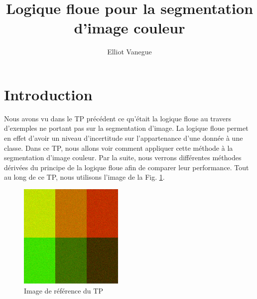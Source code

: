\documentclass[a4paper,11pt]{article}
\title{Logique floue pour la segmentation d'image couleur}
\author{Elliot Vanegue}
\begin{document}
\maketitle


\section{Introduction}
Nous avons vu dans le TP précédent ce qu'était la logique floue au travers d'exemples ne portant pas 
sur la segmentation d'image. La logique floue permet en effet d'avoir un niveau d'incertitude sur 
l'appartenance d'une donnée à une classe. Dans ce TP, nous allons voir comment appliquer cette méthode
à la segmentation d'image couleur. Par la suite, nous verrons différentes méthodes dérivées du 
principe de la logique floue afin de comparer leur performance. Tout au long de ce TP, nous utilisons
l'image de la Fig. \ref{fig:reference}.

\begin{figure}[!h]
  \begin{center}
    \includegraphics[width=5cm]{6_classes_RGB.png}
    \caption{Image de référence du TP}
    \label{fig:reference}
  \end{center}
\end{figure}
\end{document}
